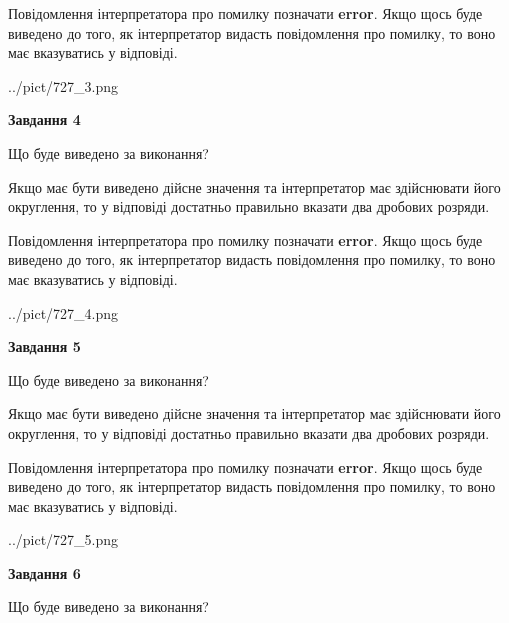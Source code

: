 \documentclass[12pt, ukrainian]{article}
\begin{document}
{\begin {Large}
Повідомлення інтерпретатора про помилку позначати \textbf{error}.
Якщо щось буде виведено до того, як інтерпретатор видасть повідомлення про помилку, 
то воно має вказуватись у відповіді. \par

\begin{center}
	{../pict/727_3.png}
\end{center}
\newpage

{\begin {center}\textbf{Завдання 4}\end {center}}\par
Що буде виведено за виконання? \par

Якщо має бути виведено дійсне значення та інтерпретатор має здійснювати його округлення, 
то у відповіді достатньо правильно вказати два дробових розряди.

Повідомлення інтерпретатора про помилку позначати \textbf{error}.
Якщо щось буде виведено до того, як інтерпретатор видасть повідомлення про помилку, 
то воно має вказуватись у відповіді. \par

\begin{center}
	{../pict/727_4.png}
\end{center}
\newpage

{\begin {center}\textbf{Завдання 5}\end {center}}\par
Що буде виведено за виконання? \par

Якщо має бути виведено дійсне значення та інтерпретатор має здійснювати його округлення, 
то у відповіді достатньо правильно вказати два дробових розряди.

Повідомлення інтерпретатора про помилку позначати \textbf{error}.
Якщо щось буде виведено до того, як інтерпретатор видасть повідомлення про помилку, 
то воно має вказуватись у відповіді. \par

\begin{center}
	{../pict/727_5.png}
\end{center}
\newpage

{\begin {center}\textbf{Завдання 6}\end {center}}\par
Що буде виведено за виконання? \par


\end{Large}}
\end{document}
